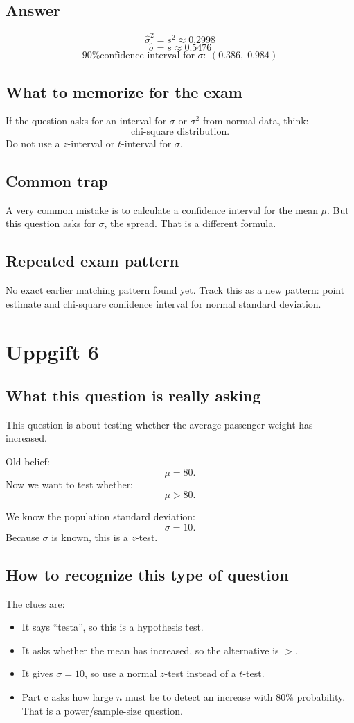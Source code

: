 \documentclass[11pt,a4paper]{article}
\begin{document}
\subsection*{Answer}
\[
\boxed{\hat{\sigma}^2=s^2\approx 0.2998}
\]
\[
\boxed{\hat{\sigma}=s\approx 0.5476}
\]
\[
\boxed{\text{90\% confidence interval for }\sigma:\ (0.386,\;0.984)}
\]

\subsection*{What to memorize for the exam}
If the question asks for an interval for \(\sigma\) or \(\sigma^2\) from normal data, think:
\[
\text{chi-square distribution}.
\]
Do not use a \(z\)-interval or \(t\)-interval for \(\sigma\).

\subsection*{Common trap}
A very common mistake is to calculate a confidence interval for the mean \(\mu\). But this question asks for \(\sigma\), the spread. That is a different formula.

\subsection*{Repeated exam pattern}
No exact earlier matching pattern found yet. Track this as a new pattern: point estimate and chi-square confidence interval for normal standard deviation.

\section*{Uppgift 6}

\subsection*{What this question is really asking}
This question is about testing whether the average passenger weight has increased.

Old belief:
\[
\mu=80.
\]
Now we want to test whether:
\[
\mu>80.
\]

We know the population standard deviation:
\[
\sigma=10.
\]
Because \(\sigma\) is known, this is a \(z\)-test.

\subsection*{How to recognize this type of question}
The clues are:
\begin{itemize}[leftmargin=*]
    \item It says ``testa'', so this is a hypothesis test.
    \item It asks whether the mean has increased, so the alternative is \(>\).
    \item It gives \(\sigma=10\), so use a normal \(z\)-test instead of a \(t\)-test.
    \item Part c asks how large \(n\) must be to detect an increase with 80\% probability. That is a power/sample-size question.
\end{itemize}
\end{document}
